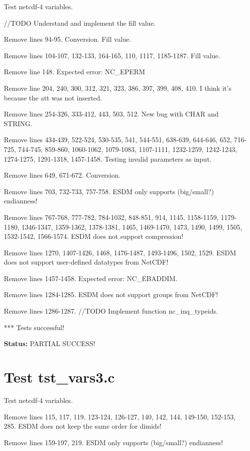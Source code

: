Test netcdf-4 variables.

//TODO Understand and implement the fill value.

Remove lines 94-95. Conversion. Fill value.

Remove lines 104-107, 132-133, 164-165, 110, 1117, 1185-1187. Fill value.

Remove line 148. Expected error: NC\_EPERM

Remove line 204, 240, 300, 312, 321, 323, 386, 397, 399, 408, 410. I think it's because the att was not inserted.

Remove lines 254-326, 333-412, 443, 503, 512. New bug with CHAR and STRING.

Remove lines 434-439, 522-524, 530-535, 541, 544-551, 638-639, 644-646, 652, 716-725, 744-745, 859-860, 1060-1062, 1079-1083, 1107-1111, 1232-1259, 1242-1243, 1274-1275, 1291-1318, 1457-1458. Testing invalid parameters as input.

Remove lines 649, 671-672. Conversion.

Remove lines 703, 732-733, 757-758. ESDM only supports (big/small?) endianness!

Remove lines 767-768, 777-782, 784-1032, 848-851, 914, 1145, 1158-1159, 1179-1180, 1346-1347, 1359-1362, 1378-1381, 1465, 1469-1470, 1473, 1490, 1499, 1505, 1532-1542, 1566-1574. ESDM does not support compression!

Remove lines 1270, 1407-1426, 1468, 1476-1487, 1493-1496, 1502, 1529. ESDM does not support user-defined datatypes from NetCDF!

Remove lines 1457-1458. Expected error: NC\_EBADDIM.

Remove lines 1284-1285. ESDM does not support groups from NetCDF!

Remove lines 1286-1287. //TODO Implement function nc\_inq\_typeids.

*** Tests successful!

{\bf \large Status: } PARTIAL SUCCESS!

\section{Test tst\_vars3.c}

Test netcdf-4 variables.

Remove lines 115, 117, 119, 123-124, 126-127, 140, 142, 144, 149-150, 152-153, 285. ESDM does not keep the same order for dimids!

Remove lines 159-197, 219. ESDM only supports (big/small?) endianness!

